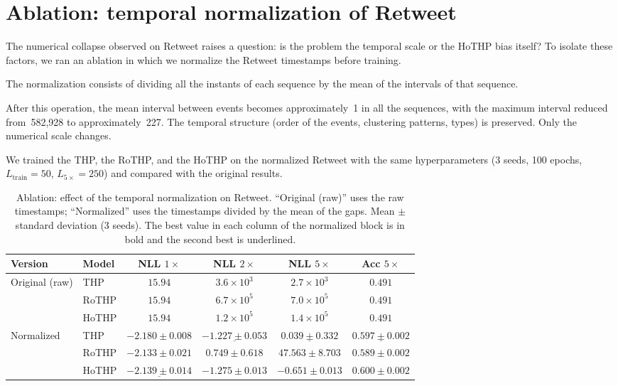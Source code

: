 \section{Ablation: temporal normalization of Retweet}
\label{sec:ablacao-retweet}

The numerical collapse observed on Retweet raises a question: is the problem the temporal scale or the HoTHP bias itself? To isolate these factors, we ran an ablation in which we normalize the Retweet timestamps before training.

The normalization consists of dividing all the instants of each sequence by the mean of the intervals of that sequence.

After this operation, the mean interval between events becomes approximately~1 in all the sequences, with the maximum interval reduced from~582,928 to approximately~227. The temporal structure (order of the events, clustering patterns, types) is preserved. Only the numerical scale changes.

We trained the THP, the RoTHP, and the HoTHP on the normalized Retweet with the same hyperparameters (3 seeds, 100 epochs, $L_{\text{train}} = 50$, $L_{5\times} = 250$) and compared with the original results.

\begin{table}[h!]
\centering
\caption{Ablation: effect of the temporal normalization on Retweet. ``Original (raw)'' uses the raw timestamps; ``Normalized'' uses the timestamps divided by the mean of the gaps. Mean $\pm$ standard deviation (3 seeds). The best value in each column of the normalized block is in bold and the second best is underlined.}
\label{tab:ablacao-retweet}
\begin{tabular}{llcccc}
\toprule
Version & Model & NLL $1\times$ & NLL $2\times$ & NLL $5\times$ & Acc $5\times$ \\
\midrule
\multirow{3}{*}{Original (raw)}
    & THP    & $15.94$ & $3.6 \times 10^{3}$ & $2.7 \times 10^{3}$ & $0.491$ \\
    & RoTHP  & $15.94$ & $6.7 \times 10^{5}$ & $7.0 \times 10^{5}$ & $0.491$ \\
    & HoTHP  & $15.94$ & $1.2 \times 10^{5}$ & $1.4 \times 10^{5}$ & $0.491$ \\
\midrule
\multirow{3}{*}{Normalized}
    & THP    & $\mathbf{-2.180 \pm 0.008}$ & $\underline{-1.227 \pm 0.053}$ & $\underline{0.039 \pm 0.332}$ & $\underline{0.597 \pm 0.002}$ \\
    & RoTHP  & $-2.133 \pm 0.021$ & $0.749 \pm 0.618$ & $47.563 \pm 8.703$ & $0.589 \pm 0.002$ \\
    & HoTHP  & $\underline{-2.139 \pm 0.014}$ & $\mathbf{-1.275 \pm 0.013}$ & $\mathbf{-0.651 \pm 0.013}$ & $\mathbf{0.600 \pm 0.002}$ \\
\bottomrule
\end{tabular}
\end{table}

